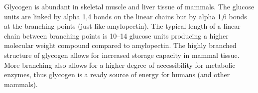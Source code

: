 \documentclass{tufte-handout}
\begin{document}
 Glycogen is abundant in skeletal muscle and liver tissue of mammals. The glucose units are linked by alpha 1,4 bonds on the linear chains but by alpha 1,6 bonds at the branching points (just like amylopectin). The typical length of a linear chain between branching points is 10--14 glucose units producing a higher molecular weight compound compared to amylopectin. The highly branched structure of glycogen allows for increased storage capacity in mammal tissue. More branching also allows for a higher degree of accessibility for metabolic enzymes, thus glycogen is a ready source of energy for humans (and other mammals).\  

%
%
\end{document}
